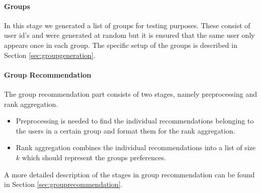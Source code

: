 \paragraph{Groups} In this stage we generated a list of groups for testing purposes. These consist of user id's and were generated at random but it is ensured that the same user only appears once in each group. The specific setup of the groups is described in Section \ref{sec:groupgeneration}.

\paragraph{Group Recommendation} The group recommendation part consists of two stages, namely preprocessing and rank aggregation.
\begin{itemize}
\item Preprocessing is needed to find the individual recommendations belonging to the users in a certain group and format them for the rank aggregation.
\item Rank aggregation combines the individual recommendations into a list of size $k$ which should represent the groups preferences.
\end{itemize}
A more detailed description of the stages in group recommendation can be found in Section \ref{sec:grouprecommendation}.


